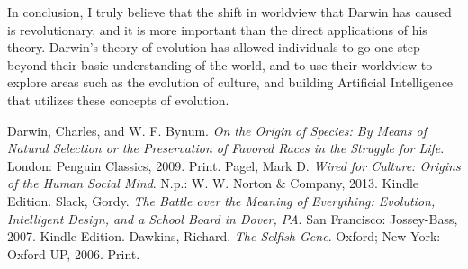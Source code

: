 \documentclass[11pt, oneside]{article}
\begin{document}
\par In conclusion, I truly believe that the shift in worldview that Darwin has caused is revolutionary, and it is more important than the direct applications of his theory. Darwin's theory of evolution has allowed individuals to go one step beyond their basic understanding of the world, and to use their worldview to explore areas such as  the evolution of culture, and building Artificial Intelligence that utilizes these concepts of evolution. 

\begin{thebibliography}{9}
	Darwin, Charles, and W. F. Bynum.
	\emph{On the Origin of Species: By Means of Natural Selection or the Preservation of Favored Races in the Struggle for Life}.
	London: Penguin Classics, 2009.
	Print.
	Pagel, Mark D. 
	\emph{Wired for Culture: Origins of the Human Social Mind}. 
	N.p.: W. W. Norton \& Company, 2013. 
	Kindle Edition. 
	Slack, Gordy. 
	\emph{The Battle over the Meaning of Everything: Evolution, Intelligent Design, and a School Board in Dover, PA}.
	San Francisco: Jossey-Bass, 2007. 
	Kindle Edition.
	Dawkins, Richard. 
	\emph{The Selfish Gene}.
	Oxford; New York: Oxford UP, 2006. 
	Print.
\end{thebibliography}
\end{document}
